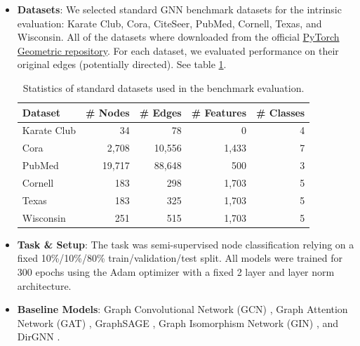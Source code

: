 \documentclass[utf8]{article}
\begin{document}
	\begin{itemize}
		\item \textbf{Datasets}: We selected standard GNN benchmark datasets for the intrinsic evaluation: Karate Club, Cora, CiteSeer, PubMed, Cornell, Texas, and Wisconsin. All of the datasets where downloaded from the official \href{https://pytorch-geometric.readthedocs.io/en/2.6.0/modules/datasets.html}{PyTorch Geometric repository}. For each dataset, we evaluated performance on their original edges (potentially directed). See table \ref{tab:dataset_stats}.
		
		\begin{table}[h!]
			\centering
			\caption{Statistics of standard datasets used in the benchmark evaluation.}
			\label{tab:dataset_stats}
			\begin{tabular}{lrrrr}
				\toprule
				\textbf{Dataset} & \textbf{\# Nodes} & \textbf{\# Edges} & \textbf{\# Features} & \textbf{\# Classes} \\ \midrule
				Karate Club      & 34             	 & 78            	 & 0                
				& 4 				  \\
				Cora             & 2,708             & 10,556            & 1,433                & 7                   \\
				PubMed           & 19,717            & 88,648            & 500                  & 3                   \\
				Cornell          & 183               & 298               & 1,703                & 5                   \\
				Texas            & 183               & 325               & 1,703                & 5                   \\
				Wisconsin        & 251               & 515               & 1,703                & 5                   \\ \bottomrule
			\end{tabular}
		\end{table}
		
		\item \textbf{Task \& Setup}: The task was semi-supervised node classification relying on a fixed 10\%/10\%/80\% train/validation/test split. All models were trained for 300 epochs using the Adam optimizer with a fixed 2 layer and layer norm architecture.
		
		\item \textbf{Baseline Models}: Graph Convolutional Network (GCN) \cite{kipf_semisupervisedclassificationgraph_2017}, Graph Attention Network (GAT) \cite{velickovic_graphattentionnetworks_2018}, GraphSAGE \cite{hamilton_inductiverepresentationlearning_2018}, Graph Isomorphism Network (GIN) \cite{xu_howpowerfulare_2019}, and DirGNN \cite{rossi_edgedirectionalityimproves_2023}.
		

\end{itemize}
\end{document}

